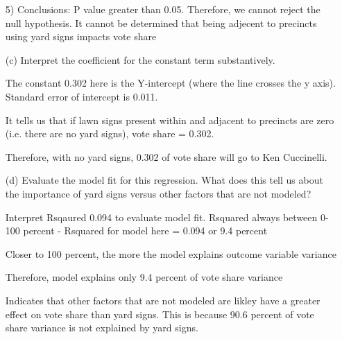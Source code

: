 \documentclass[12pt,letterpaper]{article}
\begin{document}
\begin{enumerate}
5) Conclusions: P value greater than 0.05. Therefore, we cannot reject the null hypothesis. It cannot be determined that being adjecent to precincts using yard signs impacts vote share
	\vspace{7cm}
	\item [(c)] Interpret the coefficient for the constant term substantively.
	\vspace{7cm}

The constant 0.302 here is the Y-intercept (where the line crosses the y axis). Standard error of intercept is 0.011. 

It tells us that if lawn signs present within and adjacent to precincts are zero  (i.e. there are no yard signs), vote share = 0.302. 

Therefore, with no yard signs, 0.302 of vote share will go to Ken Cuccinelli. 

	\item [(d)] Evaluate the model fit for this regression.  What does this	tell us about the importance of yard signs versus other factors that are not modeled?

Interpret Rsqaured 0.094 to evaluate model fit. 
Rsquared always between 0-100 percent
	- Rsquared for model here = 0.094 or 9.4 percent

Closer to 100 percent, the more the model explains outcome variable variance

Therefore, model explains only 9.4 percent of vote share variance

Indicates that other factors that are not modeled are likley  have a greater effect on vote share than yard signs. This is because 90.6 percent of vote share variance is not explained by yard signs.  

\end{enumerate}  
\end{document}
